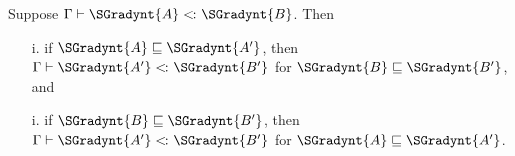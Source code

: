 \begin{lemma}
  \label{lemma:subtyping_and_precision}
  Suppose $ \Gamma  \vdash  \SGradynt{A}  <\hspace{-2px}\colon  \SGradynt{B} $. Then
  \begin{itemize}
  \item[i.] if $ \SGradynt{A}  \sqsubseteq  \SGradynt{A'} $, then $ \Gamma  \vdash  \SGradynt{A'}  <\hspace{-2px}\colon  \SGradynt{B'} $ for $ \SGradynt{B}  \sqsubseteq  \SGradynt{B'} $, and
  \item[i.] if $ \SGradynt{B}  \sqsubseteq  \SGradynt{B'} $, then $ \Gamma  \vdash  \SGradynt{A'}  <\hspace{-2px}\colon  \SGradynt{B'} $ for $ \SGradynt{A}  \sqsubseteq  \SGradynt{A'} $.
  \end{itemize}
\end{lemma}
